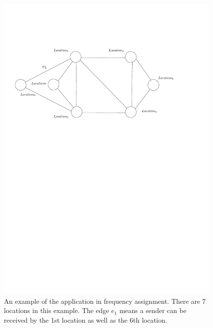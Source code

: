 \documentclass[12pt,a4paper,twoside]{scrartcl}
\numberwithin{equation}{section}
\begin{document}
\begin{figure}[h]
\centering
 \hbox{\hspace{7em}\includegraphics[scale=0.7]{1/Radio.pdf}} 
  \caption{An example of the application in frequency assignment. There are 7 locations in this example. The edge $e_1$ means a sender can be received by the 1st location as well as the 6th location.} 
\end{figure}
\end{document}
